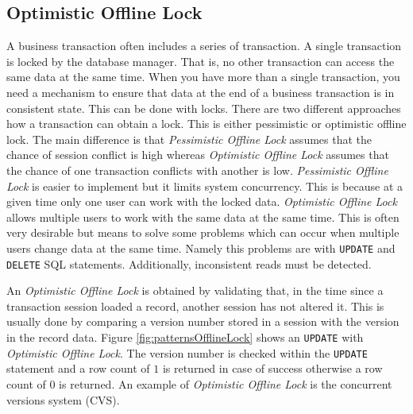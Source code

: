 		\subsection{Optimistic Offline Lock}
		\label{subsec:optimisticOfflineLock}
			A business transaction often includes a series of transaction. A single transaction
			is locked by the database manager. That is, no other transaction can access the same
			data at the same time. When you have more than a single transaction, you need a mechanism 
			to ensure that data at the end of a business transaction is in consistent state. This
			can be done with locks.
			There are two different approaches how a transaction can obtain a lock. This is
			either pessimistic or optimistic offline lock. The main difference is that \textit{Pessimistic
			Offline Lock} assumes that the chance of session conflict is high whereas \textit{Optimistic Offline
			Lock} assumes that the chance of one transaction conflicts with another is low. \textit{Pessimistic
			Offline Lock} is easier to implement but it limits system concurrency. This is because at a given time
			only one user can work with the locked data. \textit{Optimistic Offline Lock} allows multiple users to
			work with the same data at the same time. This is often very desirable but means to solve some problems
			which can occur when multiple users change data at the same time. Namely this problems are with
			\verb~UPDATE~ and \verb~DELETE~ SQL statements. Additionally, inconsistent reads must be detected.
			
			An \textit{Optimistic Offline Lock} is obtained by validating that, in the time since a transaction session loaded a
			record, another session has not altered it. This is usually done by comparing a version number
			stored in a session with the version in the record data.
			Figure \ref{fig:patternsOfflineLock} shows an \verb~UPDATE~ with \textit{Optimistic Offline Lock}. The version
			number is checked within the \verb~UPDATE~ statement and a row count of $1$ is returned in case of
			success otherwise a row count of $0$ is returned. An example of \textit{Optimistic Offline Lock} is 
			the concurrent versions system (CVS).
			
